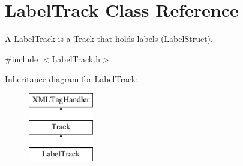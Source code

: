 \hypertarget{class_label_track}{}\section{Label\+Track Class Reference}
\label{class_label_track}


A \hyperlink{class_label_track}{Label\+Track} is a \hyperlink{class_track}{Track} that holds labels (\hyperlink{class_label_struct}{Label\+Struct}).  




{\ttfamily \#include $<$Label\+Track.\+h$>$}

Inheritance diagram for Label\+Track\+:\begin{figure}[H]
\begin{center}
\leavevmode
\includegraphics[height=3.000000cm]{class_label_track}
\end{center}
\end{figure}
